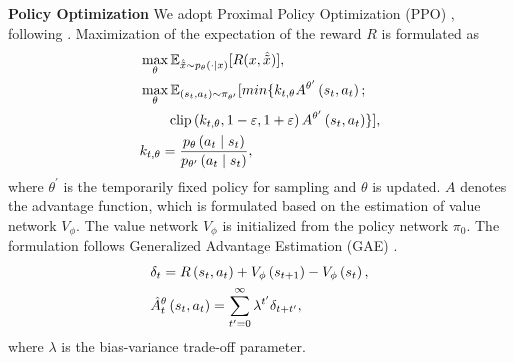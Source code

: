 \noindent \textbf{Policy Optimization} \quad
We adopt Proximal Policy Optimization (PPO) \cite{schulman2017ppo}, following \cite{Ramamurthy2022IsRL}. 
Maximization of the expectation of the reward $R$ is formulated as
\begin{equation}
\setlength{\abovedisplayskip}{5pt}
\setlength{\belowdisplayskip}{5pt}
\begin{split}
&\max _{\theta} \mathbb{E}_{\hat{\tilde{x}} \sim p_{\theta}(\cdot \mid x)}[R(x,\hat{\tilde{x}})],\\
&\max _{\theta} \mathbb{E}_{\left(s_t, a_t\right) \sim \pi_{\theta^{\prime}}}[min\{k_{t, \theta} A^{\theta^{\prime}}\left(s_t, a_t\right);\\
&\quad \quad \operatorname{clip}\left(k_{t, \theta}, 1-\varepsilon, 1+\varepsilon\right) A^{\theta^{\prime}}\left(s_t, a_t\right)\}], \\
& k_{t, \theta} = \frac{p_\theta\left(a_t \mid s_t\right)}{p_{\theta^{\prime}}\left(a_t \mid s_t\right)},\\
\end{split}
\end{equation}
where $\theta^{\prime}$ is the temporarily fixed policy for sampling and $\theta$ is updated.
$A$ denotes the advantage function, which is formulated based on the estimation of value network $V_{\phi}$.
The value network $V_{\phi}$ is initialized from the policy network $\pi_{0}$. 
The formulation follows Generalized Advantage Estimation (GAE) \cite{schulman2015gae}.
\begin{equation}
\begin{split}
\setlength{\abovedisplayskip}{5pt}
\setlength{\belowdisplayskip}{5pt}
&\delta_t=R\left(s_t, a_t\right)+V_\phi\left(s_{t+1}\right)-V_\phi\left(s_t\right), \\
&\hat{A}^{\theta}_{t}\left(s_t, a_t\right)=\sum_{t^{\prime}=0}^{\infty} \lambda^{t^{\prime}} \delta_{t+t^{\prime}},
\end{split}
\end{equation}
where $\lambda$ is the bias-variance trade-off parameter.

